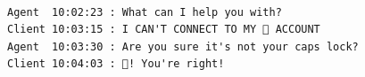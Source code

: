 \documentclass[11pt]{article}
\begin{document}
    \begin{Verbatim}[commandchars=\\\{\}]

Agent  10:02:23 : What can I help you with?
Client 10:03:15 : I CAN'T CONNECT TO MY 😤 ACCOUNT
Agent  10:03:30 : Are you sure it's not your caps lock?
Client 10:04:03 : 😤! You're right!

    \end{Verbatim}


    
    
    
\end{document}
